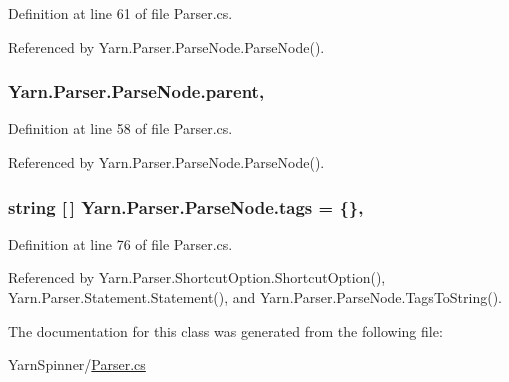 Definition at line 61 of file Parser.\-cs.



Referenced by Yarn.\-Parser.\-Parse\-Node.\-Parse\-Node().

\hypertarget{a00138_af313a82103fcc2ff5a177dbb06b92f7b}{
\subsubsection[{parent}]{ Yarn.\-Parser.\-Parse\-Node.\-parent\hspace{0.3cm}{\ttfamily [package]}, {\ttfamily [inherited]}}}\label{a00138_af313a82103fcc2ff5a177dbb06b92f7b}


Definition at line 58 of file Parser.\-cs.



Referenced by Yarn.\-Parser.\-Parse\-Node.\-Parse\-Node().

\hypertarget{a00138_a58b3a15788fd2d4127d73619dc6d04ae}{
\subsubsection[{tags}]{\setlength{\rightskip}{0pt plus 5cm}string \mbox{[}$\,$\mbox{]} Yarn.\-Parser.\-Parse\-Node.\-tags = \{\}\hspace{0.3cm}{\ttfamily [package]}, {\ttfamily [inherited]}}}\label{a00138_a58b3a15788fd2d4127d73619dc6d04ae}


Definition at line 76 of file Parser.\-cs.



Referenced by Yarn.\-Parser.\-Shortcut\-Option.\-Shortcut\-Option(), Yarn.\-Parser.\-Statement.\-Statement(), and Yarn.\-Parser.\-Parse\-Node.\-Tags\-To\-String().



The documentation for this class was generated from the following file\-:\begin{DoxyCompactItemize}
\item 
Yarn\-Spinner/\hyperlink{a00295}{Parser.\-cs}\end{DoxyCompactItemize}
